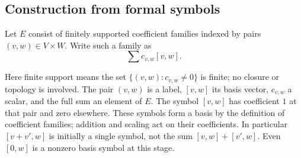 \subsection{Construction from formal symbols}

Let $E$ consist of finitely supported coefficient families indexed by pairs
$(v,w)\in V\times W$. Write such a family as
\[
\sum c_{v,w}[v,w].
\]

Here finite support means the set $\{(v,w):c_{v,w}\ne0\}$ is finite;
no closure or topology is involved. The pair $(v,w)$ is a label,
$[v,w]$ its basis vector, $c_{v,w}$ a scalar, and the full sum an element of $E$.
The symbol $[v,w]$ has coefficient $1$ at that pair and zero elsewhere.
These symbols form a basis by the definition of coefficient families;
addition and scaling act on their coefficients. In particular $[v+v',w]$
is initially a single symbol, not the sum $[v,w]+[v',w]$. Even $[0,w]$
is a nonzero basis symbol at this stage.

